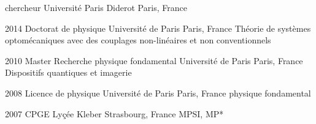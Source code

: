 \documentclass[10pt]{article}
\begin{document}
\myProExperiencesSeparator{}

    {chercheur}
    {Université Paris Diderot}
    {Paris, France}

\myProExperienceDetailSummary{\loremParagraph}

\myProExperienceDetailSkills{
    $\ni$ \loremSentence{}\\
    $\ni$ \loremSentence{}\\
    $\ni$ \loremSentence{}\\
    $\ni$ \loremSentence{}\\
    $\ni$ \loremSentence{}\\
}


\myProExperienceDetailsSeparator

\myProExperienceDetailSummary{\loremParagraph}

\myProExperienceDetailSkills{
    $\ni$ \loremSentence{}\\
    $\ni$ \loremSentence{}\\
    $\ni$ \loremSentence{}\\
    $\ni$ \loremSentence{}\\
    $\ni$ \loremSentence{}\\
}



\mySectionsSeparator{}


\myDiplomaEntry
    {2014}
    {Doctorat de physique}
    {Université de Paris}
    {Paris, France}
    {Théorie de systèmes optomécaniques avec des couplages non-linéaires et non conventionnels}

\myDiplomaEntry
    {2010}
    {Master Recherche physique fondamental}
    {Université de Paris}
    {Paris, France}
    {Dispositifs quantiques et imagerie}

\myDiplomaEntry
    {2008}
    {Licence de physique}
    {Université de Paris}
    {Paris, France}
    {physique fondamental}

\myDiplomaEntry
    {2007}
    {CPGE}
    {Lyçée Kleber}
    {Strasbourg, France}
    {MPSI, MP*}
\end{document}
